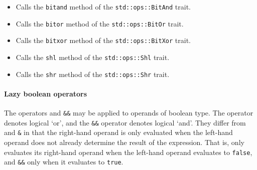 \documentclass[]{article}
\begin{document}
\begin{itemize}
\item

  Calls the \texttt{bitand} method of the \texttt{std::ops::BitAnd}
  trait.
\item

  Calls the \texttt{bitor} method of the \texttt{std::ops::BitOr} trait.
\item

  Calls the \texttt{bitxor} method of the \texttt{std::ops::BitXor}
  trait.
\item

  Calls the \texttt{shl} method of the \texttt{std::ops::Shl} trait.
\item

  Calls the \texttt{shr} method of the \texttt{std::ops::Shr} trait.
\end{itemize}

\paragraph{Lazy boolean operators}\label{lazy-boolean-operators}

The operators \texttt{\textbar{}\textbar{}} and \texttt{\&\&} may be
applied to operands of boolean type. The \texttt{\textbar{}\textbar{}}
operator denotes logical `or', and the \texttt{\&\&} operator denotes
logical `and'. They differ from \texttt{\textbar{}} and \texttt{\&} in
that the right-hand operand is only evaluated when the left-hand operand
does not already determine the result of the expression. That is,
\texttt{\textbar{}\textbar{}} only evaluates its right-hand operand when
the left-hand operand evaluates to \texttt{false}, and \texttt{\&\&}
only when it evaluates to \texttt{true}.
\end{document}
